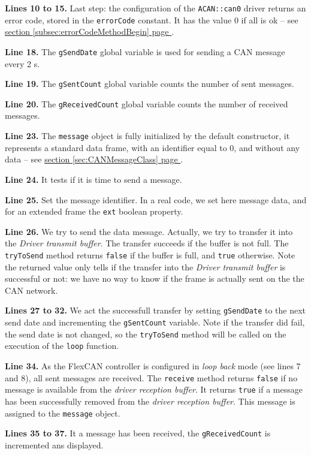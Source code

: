 \documentclass[10pt, a4paper, obeyspaces, openany]{extarticle}
\newcommand\refSectionPage[1]{\hyperref[sec:#1]{section \ref*{sec:#1} page \pageref{sec:#1}}}
\newcommand\refSubsectionPage[1]{\hyperref[subsec:#1]{section \ref*{subsec:#1} page \pageref{subsec:#1}}}
\begin{document}
{\bf Lines 10 to 15.} Last step: the configuration of the \texttt{ACAN::can0} driver returns an error code, stored in the \texttt{errorCode} constant. It has the value $0$ if all is ok -- see \refSubsectionPage{errorCodeMethodBegin}.

{\bf Line 18.} The \texttt{gSendDate} global variable is used for sending a CAN message every 2 s.

{\bf Line 19.} The \texttt{gSentCount} global variable counts the number of sent messages.

{\bf Line 20.} The \texttt{gReceivedCount} global variable counts the number of received messages.


{\bf Line 23.} The \texttt{message} object is fully initialized by the default constructor, it represents a standard data frame, with an identifier equal to $0$, and without any data -- see \refSectionPage{CANMessageClass}. 

{\bf Line 24.} It tests if it is time to send a message.

{\bf Line 25.} Set the message identifier. In a real code, we set here message data, and for an extended frame the \texttt{ext} boolean property.

{\bf Line 26.} We try to send the data message. Actually, we try to transfer it into the \emph{Driver transmit buffer}. The transfer succeeds if the buffer is not full. The \texttt{tryToSend} method returns \texttt{false} if the buffer is full, and \texttt{true} otherwise. Note the returned value only tells if the transfer into the \emph{Driver transmit buffer} is successful or not: we have no way to know if the frame is actually sent on the the CAN network.

{\bf Lines 27 to 32.} We act the successfull transfer by setting \texttt{gSendDate} to the next send date and incrementing the \texttt{gSentCount} variable. Note if the transfer did fail, the send date is not changed, so the \texttt{tryToSend} method will be called on the execution of the \texttt{loop} function.

{\bf Line 34.} As the FlexCAN controller is configured in \emph{loop back} mode (see lines 7 and 8), all sent messages are received. The \texttt{receive} method returns \texttt{false} if no message is available from the \emph{driver reception buffer}. It returns \texttt{true} if a message has been successfully removed from the \emph{driver reception buffer}. This message is assigned to the \texttt{message} object.

{\bf Lines 35 to 37.} It a message has been received, the \texttt{gReceivedCount} is incremented ans displayed.
\end{document}
